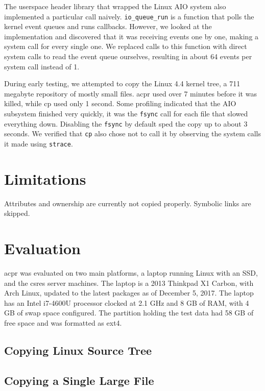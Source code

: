 \documentclass[11pt]{article}
\begin{document}
The userspace header library that wrapped the Linux AIO system also implemented
a particular call naively. \texttt{io\_queue\_run} is a function that polls the
kernel event queues and runs callbacks. However, we looked at the implementation
and discovered that it was receiving events one by one, making a system call for
every single one. We replaced calls to this function with direct system calls to
read the event queue ourselves, resulting in about 64 events per system call
instead of 1.

During early testing, we attempted to copy the Linux 4.4 kernel tree, a 711 megabyte repository of mostly small files. acpr used over 7 minutes before it was killed, while cp used only 1 second. Some profiling indicated that the AIO subsystem finished very quickly, it was the \texttt{fsync} call for each file that slowed everything down. Disabling the \texttt{fsync} by default sped the copy up to about 3 seconds. We verified that \texttt{cp} also chose not to call it by observing the system calls it made using \texttt{strace}.

\section{Limitations}

Attributes and ownership are currently not copied properly. Symbolic links are skipped.

\section{Evaluation}
acpr was evaluated on two main platforms, a laptop running Linux with an SSD, and the csres server machines. The laptop is a 2013 Thinkpad X1 Carbon, with Arch Linux, updated to the latest packages as of December 5, 2017. The laptop has an Intel i7-4600U processor clocked at 2.1 GHz and 8 GB of RAM, with 4 GB of swap space configured. The partition holding the test data had 58 GB of free space and was formatted as ext4.

\subsection{Copying Linux Source Tree}

\subsection{Copying a Single Large File}
\end{document}
